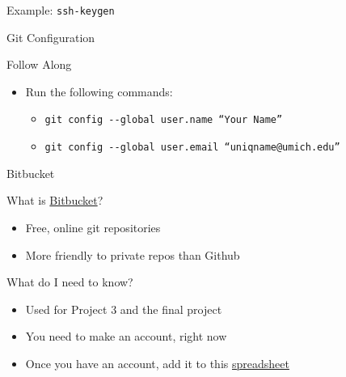 \documentclass[table,dvipsnames]{beamer}
\begin{document}
\begin{frame}{Example: \texttt{ssh-keygen}}
\end{frame}

\begin{frame}{Git Configuration}
	\begin{block}{Follow Along}
		\begin{itemize}
			\item Run the following commands:
				\begin{itemize}
					\item \texttt{git config -{}-global user.name ``Your Name''}
					\item \texttt{git config -{}-global user.email ``uniqname@umich.edu''}
				\end{itemize}
		\end{itemize}
	\end{block}
\end{frame}

\begin{frame}[fragile]{Bitbucket}
	\begin{block}{What is \href{https://bitbucket.org/}{Bitbucket}?}
		\begin{itemize}
			\item Free, online git repositories
			\item More friendly to private repos than Github
		\end{itemize}
	\end{block}
	\begin{block}{What do I need to know?}
		\begin{itemize}
			\item Used for Project 3 and the final project
			\item You need to make an account, right now
			\item Once you have an account, add it to this
				\href{https://docs.google.com/spreadsheets/d/1N5EKp01RqMQF2hDmvTimF4kjQmUhuaGxmFt1uVJ_rUI/edit?usp=sharing}{spreadsheet}
		\end{itemize}
	\end{block}
	\hyperlink{bitbucket}{}
\end{frame}
\end{document}
